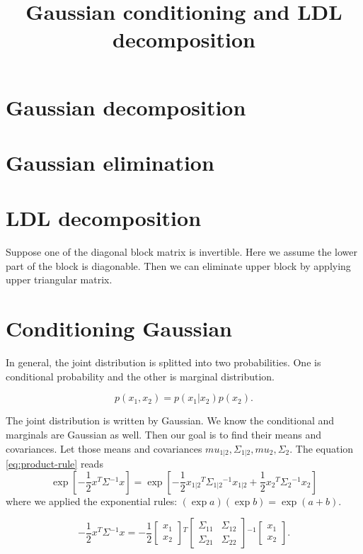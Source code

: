 \documentclass[twoside, uplatex]{article}
\title{Gaussian conditioning and LDL decomposition}
\newcommand{\transpose}{{}^T}
\newcommand{\inverse}{{}^{-1}}
\newcommand{\half}{\frac{1}{2}}
\newcommand{\given}[2]{ {{1}|{2}}}
\begin{document}
\maketitle

\section{Gaussian decomposition}

\section{Gaussian elimination}

\section{LDL decomposition}

Suppose one of the diagonal block matrix is invertible. Here we assume the lower part of the block is diagonable.
Then we can eliminate upper block by applying upper triangular matrix.

\section{Conditioning Gaussian}

In general, the joint distribution is splitted into two probabilities.  One is conditional probability and the other is marginal distribution.

\begin{equation}
    \label{eq:product-rule}
    p(x_1, x_2) = p(x_1 | x_2) p(x_2).
\end{equation}

The joint distribution is written by Gaussian. We know the conditional and marginals are Gaussian as well.
Then our goal is to find their means and covariances. Let those means and covariances $mu_{\given{1}{2}}, \Sigma_{\given{1}{2}}, mu_2, \Sigma_2$.
The equation \ref{eq:product-rule} reads
\begin{equation}
    \exp \left [ -\half x\transpose \Sigma\inverse x \right ] = \exp \left [- \half x_\given{1}{2}\transpose \Sigma_\given{1}{2}\inverse x_\given{1}{2} + \half x_2 \transpose \Sigma_2 \inverse x_2 \right ]
\end{equation}
where we applied the exponential rules:  $(\exp a)(\exp b) = \exp(a+b).$


\begin{equation}
- \half  x\transpose \Sigma \inverse x = -\half \begin{bmatrix} x_1 \\ x_2 \end{bmatrix} \transpose \begin{bmatrix}\Sigma_{11} & \Sigma_{12} \\ \Sigma_{21} & \Sigma_{22} \end{bmatrix} \inverse \begin{bmatrix} x_1 \\ x_2 \end{bmatrix}.
\end{equation}
\end{document}
